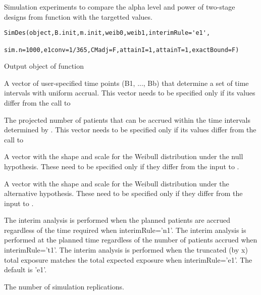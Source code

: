 \begin{Description}\relax
Simulation experiments to compare the
alpha level and power of two-stage designs from function
 with the targetted values.
\end{Description}
\begin{Usage}
\begin{verbatim}
SimDes(object,B.init,m.init,weib0,weib1,interimRule='e1',
       sim.n=1000,e1conv=1/365,CMadj=F,attainI=1,attainT=1,exactBound=F)
\end{verbatim}
\end{Usage}
\begin{Arguments}
\begin{ldescription}
\item[\code{object}] Output object of function 
\item[\code{B.init}] A vector of user-specified time points (B1, ..., Bb) that determine a
set of time intervals with uniform accrual.  This vector 
needs to be specified only if its values differ from the call to
\item[\code{m.init}] The projected
number of patients that can be accrued within the time intervals
determined by .  This vector 
needs to be specified only if its values differ from the call to
\item[\code{weib0}] A vector with the shape and scale for the Weibull distribution under the
null hypothesis.  These need to be specified only if they differ from
the input to .
\item[\code{weib1}] A vector with the shape and scale for the Weibull distribution under the
alternative hypothesis.  These need to be specified only if they differ from
the input to .
\item[\code{interimRule}] The interim analysis is performed when the planned
 patients are accrued regardless of the time required when
interimRule='n1'.  The interim analysis is performed at the planned
time  regardless of the number of patients accrued when
interimRule='t1'.  The interim analysis is performed when the
truncated (by x) total exposure matches the total expected exposure 
when interimRule='e1'.  The default is 'e1'.
\item[\code{sim.n}] The number of simulation replications.

\end{ldescription}
\end{Arguments}
